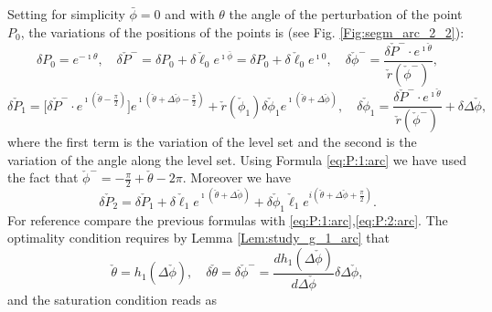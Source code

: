 \documentclass[reqno]{amsart}
\theoremstyle{definition} \newtheorem{definition}{Definition}[section]
\theoremstyle{definition} \newtheorem{remark}[definition]{Remark}
\theoremstyle{plain} \newtheorem{lemma}[definition]{Lemma}
\theoremstyle{plain} \newtheorem{proposition}[definition]{Proposition}
\theoremstyle{plain} \newtheorem{theorem}[definition]{Theorem}
\theoremstyle{plain} \newtheorem{corollary}[definition]{Corollary}
\theoremstyle{definition} \newtheorem{example}[definition]{Example}
\theoremstyle{plain} \newtheorem{claim}[clai]{Claim}
\theoremstyle{definition} \newtheorem{assumption}[definition]{Assumption}
\theoremstyle{definition} \newtheorem{observation}[definition]{Observation}
\newcommand{\1}{\mathbbm 1}
\renewcommand{\i}{\imath}
\numberwithin{equation}{section} %
\theoremstyle{plain} \newtheorem*{theorem*}{Theorem}
\theoremstyle{plain} \newtheorem{mthm}[maintheorem]{Main Theorem}
\theoremstyle{plain} \newtheorem*{mthm*}{Main Theorem}
\theoremstyle{plain} \newtheorem*{conjecture*}{Conjecture}
\theoremstyle{plain} \newtheorem{conjecture}[definition]{Conjecture}
\theoremstyle{plain} \newtheorem*{problem*}{Problem}
\begin{document}
Setting for simplicity $\bar \phi = 0$ and with $\theta$ the angle of the perturbation of the point $P_0$, the  variations of the positions of the points is (see Fig. \ref{Fig:segm_arc_2_2}):
\begin{equation*}
\delta P_0 = e^{- \i \theta}, \quad \delta \check P^- = \delta P_0 + \delta \check \ell_0 e^{\i \bar\phi}=\delta P_0 + \delta \check \ell_0 e^{\i 0}, \quad \delta \check \phi^- = \frac{\delta \check P^- \cdot e^{\i \check \theta}}{\check r(\check \phi^-)},
\end{equation*}
\begin{equation*}
\delta \check P_1 = \big[ \delta \check P^- \cdot e^{\i (\check \theta - \frac{\pi}{2})} \big] e^{\i (\check \theta + \Delta \check \phi - \frac{\pi}{2})} + \check r(\check \phi_1) \delta \check \phi_1 e^{\i (\check \theta + \Delta \check \phi)}, \quad \delta \check \phi_1 = \frac{\delta \check P^- \cdot e^{\i \check \theta}}{\check r(\check \phi^-)} + \delta \Delta \check \phi,
\end{equation*}
where the first term is the variation of the level set and the second is the variation of the angle along the level set. Using Formula \eqref{eq:P:1:arc} we have used the fact that $\check\phi^-=-\frac{\pi}{2}+\check\theta-2\pi$. Moreover we have
\begin{equation*}
\delta \check P_2 = \delta \check P_1 + \delta \check \ell_1 e^{\i (\check \theta + \Delta \check \phi)} + \delta \check \phi_1 \check \ell_1 e^{i (\check \theta + \Delta \check \phi + \frac{\pi}{2})}.
\end{equation*}
For reference compare the previous formulas with \eqref{eq:P:1:arc},\eqref{eq:P:2:arc}.
The optimality condition requires by Lemma \ref{Lem:study_g_1_arc} that
\begin{equation*}
\check \theta = h_1(\Delta \check \phi), \quad \delta \check \theta = \delta \check \phi^- = \frac{dh_1(\Delta \check \phi)}{d\Delta \check\phi} \delta \Delta \check \phi,
\end{equation*}
and the saturation condition reads as
\end{document}
